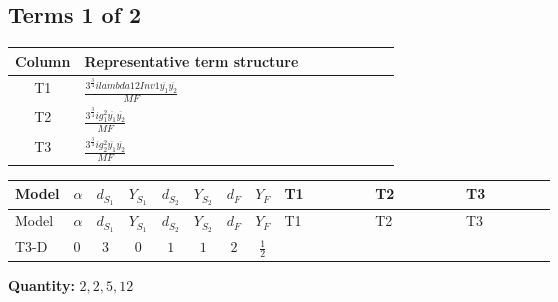 \documentclass[8pt]{article}
\begin{document}
\begin{landscape}
\subsection*{Terms 1 of 2}
\begin{center}
\begin{tabular}{@{}c >{\raggedright\arraybackslash}p{0.82\linewidth}@{}}
\toprule
Column & Representative term structure \\
\midrule
T1 & \(\displaystyle \frac{3^{\frac{3}{4}} i lambda12Inv1 \overline{y_{1}} \overline{y_{2}}}{MF}\) \\
\midrule
T2 & \(\displaystyle \frac{3^{\frac{3}{4}} i g_{1}^{2} \overline{y_{1}} \overline{y_{2}}}{MF}\) \\
\midrule
T3 & \(\displaystyle \frac{3^{\frac{3}{4}} i g_{2}^{2} \overline{y_{1}} \overline{y_{2}}}{MF}\) \\
\midrule
\bottomrule
\end{tabular}
\end{center}
\smallskip
\tiny
\begin{longtable}{@{}llcccccc >{\raggedright\arraybackslash}p{0.21\linewidth} >{\raggedright\arraybackslash}p{0.21\linewidth} >{\raggedright\arraybackslash}p{0.21\linewidth}@{}}
\toprule
Model & $\alpha$ & $d_{S_1}$ & $Y_{S_1}$ & $d_{S_2}$ & $Y_{S_2}$ & $d_F$ & $Y_F$ & T1 & T2 & T3 \\
\midrule
\endfirsthead
\toprule
Model & $\alpha$ & $d_{S_1}$ & $Y_{S_1}$ & $d_{S_2}$ & $Y_{S_2}$ & $d_F$ & $Y_F$ & T1 & T2 & T3 \\
\midrule
\endhead
T3-D & $0$ & $3$ & $0$ & $1$ & $1$ & $2$ & $\frac{1}{2}$ & \scriptsize\adjustbox{max width=\linewidth}{$\begin{gathered} \frac{3^{\frac{3}{4}} i lambda12Inv1 \overline{y_{1}} \overline{y_{2}}}{6 MF}\end{gathered}$} & \scriptsize\adjustbox{max width=\linewidth}{$\begin{gathered} \frac{3^{\frac{3}{4}} i g_{1}^{2} \overline{y_{1}} \overline{y_{2}}}{8 MF}\end{gathered}$} & \scriptsize\adjustbox{max width=\linewidth}{$\begin{gathered} \frac{11 \cdot 3^{\frac{3}{4}} i g_{2}^{2} \overline{y_{1}} \overline{y_{2}}}{8 MF}\end{gathered}$} \\
\midrule
\bottomrule
\end{longtable}
\clearpage
\noindent\textbf{Quantity: }$\mathrm{2,2,5,12}$\par\smallskip

\end{landscape}
\end{document}
